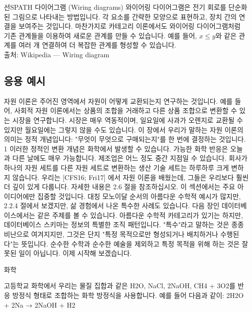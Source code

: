 \documentclass[11pt, a4paper, twoside, openany]{book}
\begin{document}
{\begin{deepresearch}{선\hspace{0pt}SPATH 다이어그램 (Wiring diagrams)}
와이어링 다이어그램은 전기 회로를 단순화된 그림으로 나타내는 방법입니다.  각 요소를 간략한 모양으로 표현하고, 장치 간의 연결을 보여주는 것입니다. 마찬가지로 카테고리 이론에서도 와이어링 다이어그램처럼 기존 관계들을 이용하여 새로운 관계를 만들 수 있습니다. 예를 들어, $x \leq y$와 같은 관계를 여러 개 연결하여 더 복잡한 관계를 형성할 수 있습니다.
\\[4pt]{\footnotesize\color{ctgray} 출처: Wikipedia — Wiring diagram}
\end{deepresearch}


\subsection{응용 예시}
\label{sec:2-2-3}

자원 이론은 주어진 영역에서 자원이 어떻게 교환되는지 연구하는 것입니다. 예를 들어, 사회적 자원 이론에서는 상품의 조합을 거래하고 다른 상품 조합으로 변환할 수 있는 시장을 연구합니다. 시장은 매우 역동적이며, 일요일에 사과가 오렌지로 교환될 수 있지만 월요일에는 그렇지 않을 수도 있습니다. 이 장에서 우리가 말하는 자원 이론의 의미는 정적 개념입니다: "무엇이 무엇으로 구매되는지"를 한 번에 결정하는 것입니다. 1 이러한 정적인 변환 개념은 화학에서 발생할 수 있습니다. 가능한 화학 반응은 오늘과 다른 날에도 매우 가능합니다. 제조업은 어느 정도 중간 지점일 수 있습니다. 회사가 하나의 자원 세트를 다른 자원 세트로 변환하는 생산 기술 세트는 하루하루 크게 변하지 않습니다. 우리는 [CFS16; Fri17] 에서 자원 이론을 배웠는데, 그들은 우리보다 훨씬 더 깊이 있게 다룹니다. 자세한 내용은 2.6 절을 참조하십시오. 이 섹션에서는 주요 아이디어에만 집중할 것입니다. 대칭 모노이달 순서의 아름다운 수학적 예시가 많지만, 2.2.4 절에서 보겠지만, 삶 경험에서 나온 특수한 사례도 있습니다. 다음 장인 데이터베이스에서는 같은 주제를 볼 수 있습니다. 아름다운 수학적 카테고리가 있기는 하지만, 데이터베이스 스키마는 정보의 특별한 조직 패턴입니다. "특수"라고 말하는 것은 종종 비난으로 여겨지지만, 그것은 단지 "특정 목적으로만 형성되거나 배치하거나 수행된다"는 뜻입니다. 순수한 수학과 순수한 예술을 제외하고 특정 목적을 위해 하는 것은 잘못된 일이 아닙니다. 이제 시작해 보겠습니다.

\par\medskip
화학

\par\medskip
고등학교 화학에서 우리는 물질 집합과 같은
H2O, NaCl, 2NaOH, CH4 + 3O2\hspace{0pt}를 반응 방정식 형태로 조합하는 화학 방정식을 사용합니다. 예를 들어 다음과 같이:
2H2O + 2Na → 2NaOH + H2

}
\end{document}
